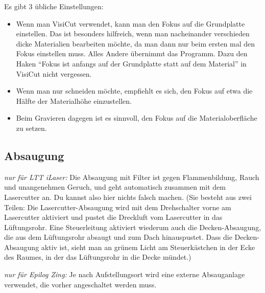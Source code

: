 \documentclass{\basedir/fablab-document}
\newcommand{\knopf}[2]{
	\begin{tikzpicture}[baseline={(box.base)}]
	\node [#1] (box) {
		\fontsize{9pt}{9pt}\selectfont \textbf{#2}\strut
	};
	\end{tikzpicture}
}
\newcommand{\nurZing}{\emph{nur für Epilog Zing:} }
\newcommand{\nurLTT}{\emph{nur für LTT iLaser:} }
\newcommand{\lueftungKnopf}[1]{\knopf{lueftungsknopf}{#1}}
\newcommand{\reflectboxX}[1]{\raisebox{\depth}{\scalebox{1}[-1]{#1}}} %
\newcommand{\returnSymbol}{\reflectboxX{\ensuremath{\mathbf{\Lsh}}}} %
\newcommand{\lueftungEnter}{\lueftungKnopf{\returnSymbol}}
\newcommand{\lueftungMinus}{\lueftungKnopf{-}}
\newcommand{\lueftungPlus}{\lueftungKnopf{+}}
\newcommand{\lueftungOn}{\lueftungKnopf{On}}
\newcommand{\lueftungOff}{\lueftungKnopf{Off}}
\begin{document}
	Es gibt 3 übliche Einstellungen:
	\begin{itemize}
		\item Wenn man VisiCut verwendet, kann man den Fokus auf die Grundplatte einstellen. Das ist besonders hilfreich, wenn man nacheinander verschieden dicke Materialien bearbeiten möchte, da man dann nur beim ersten mal den Fokus einstellen muss. Alles Andere übernimmt das Programm. Dazu den Haken ``Fokus ist anfangs auf der Grundplatte statt auf dem Material'' in VisiCut nicht vergessen.
		\item Wenn man nur schneiden möchte, empfiehlt es sich, den Fokus auf etwa die Hälfte der Materialhöhe einzustellen.
		\item Beim Gravieren dagegen ist es sinnvoll, den Fokus auf die Materialoberfläche zu setzen.
	\end{itemize}
	
	
	
	\subsection{Absaugung}
	\label{sec:absaugung}
	
	\nurLTT Die Absaugung mit Filter ist gegen Flammenbildung, Rauch und unangenehmen Geruch, und geht automatisch zusammen mit dem Lasercutter an. Du kannst also hier nichts falsch machen. (Sie besteht aus zwei Teilen: Die Lasercutter-Absaugung wird mit dem Drehschalter vorne am Lasercutter aktiviert und pustet die Dreckluft vom Lasercutter in das Lüftungsrohr. Eine Steuerleitung aktiviert wiederum auch die Decken-Absaugung, die aus dem Lüftungsrohr absaugt und zum Dach hinauspustet. Dass die Decken-Absaugung aktiv ist, sieht man an grünem Licht am Steuerkästchen in der Ecke des Raumes, in der das Lüftungsrohr in die Decke mündet.)
	
	\nurZing Je nach Aufstellungsort wird eine externe Absauganlage verwendet, die vorher angeschaltet werden muss.
	
	
\end{document}
